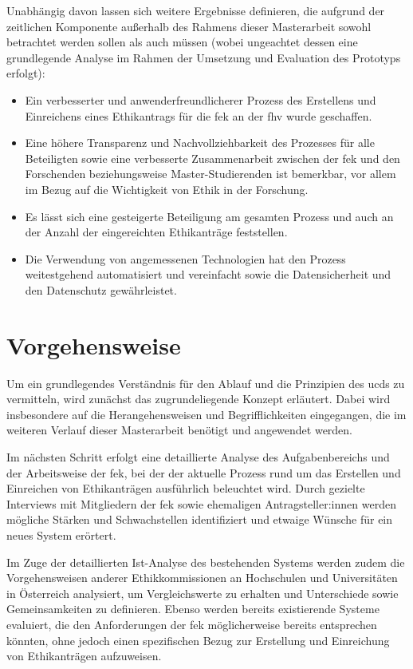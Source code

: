 \documentclass[a4paper,12pt,twoside,numbers=noendperiod]{scrreprt}
\begin{document}
Unabhängig davon lassen sich weitere Ergebnisse definieren, die aufgrund der zeitlichen Komponente außerhalb des Rahmens dieser Masterarbeit sowohl betrachtet werden sollen als auch müssen (wobei ungeachtet dessen eine grundlegende Analyse im Rahmen der Umsetzung und Evaluation des Prototyps erfolgt):
\begin{itemize}
    \item Ein verbesserter und anwenderfreundlicherer Prozess des Erstellens und Einreichens eines Ethikantrags für die \acl{fek} an der \acl{fhv} wurde geschaffen.
    \item Eine höhere Transparenz und Nachvollziehbarkeit des Prozesses für alle Beteiligten sowie eine verbesserte Zusammenarbeit zwischen der \acl{fek} und den Forschenden beziehungsweise Master-Studierenden ist bemerkbar, vor allem im Bezug auf die Wichtigkeit von Ethik in der Forschung.
    \item Es lässt sich eine gesteigerte Beteiligung am gesamten Prozess und auch an der Anzahl der eingereichten Ethikanträge feststellen.
    \item Die Verwendung von angemessenen Technologien hat den Prozess weitestgehend automatisiert und vereinfacht sowie die Datensicherheit und den Datenschutz gewährleistet.
\end{itemize}

\section{Vorgehensweise}
\label{sec:vorgehensweise}

Um ein grundlegendes Verständnis für den Ablauf und die Prinzipien des \acl{ucd}s zu vermitteln, wird zunächst das zugrundeliegende Konzept erläutert. Dabei wird insbesondere auf die Herangehensweisen und Begrifflichkeiten eingegangen, die im weiteren Verlauf dieser Masterarbeit benötigt und angewendet werden.

Im nächsten Schritt erfolgt eine detaillierte Analyse des Aufgabenbereichs und der Arbeitsweise der \acl{fek}, bei der der aktuelle Prozess rund um das Erstellen und Einreichen von Ethikanträgen ausführlich beleuchtet wird. Durch gezielte Interviews mit Mitgliedern der \ac{fek} sowie ehemaligen Antragsteller:innen werden mögliche Stärken und Schwachstellen identifiziert und etwaige Wünsche für ein neues System erörtert.

Im Zuge der detaillierten Ist-Analyse des bestehenden Systems werden zudem die Vorgehensweisen anderer Ethikkommissionen an Hochschulen und Universitäten in Österreich analysiert, um Vergleichswerte zu erhalten und Unterschiede sowie Gemeinsamkeiten zu definieren. Ebenso werden bereits existierende Systeme evaluiert, die den Anforderungen der \ac{fek} möglicherweise bereits entsprechen könnten, ohne jedoch einen spezifischen Bezug zur Erstellung und Einreichung von Ethikanträgen aufzuweisen.
\end{document}
